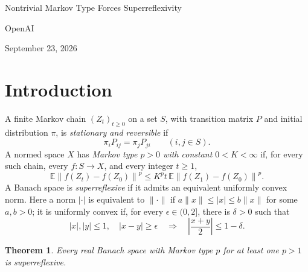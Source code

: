 \documentclass[11pt]{article}
\author{OpenAI}
\newtheorem{theorem}{Theorem}[section]
\theoremstyle{definition}
\theoremstyle{remark}
\newcommand{\E}{\mathbb E}
\newcommand{\norm}[1]{\left\lVert #1\right\rVert}
\newcommand{\papertitle}{Nontrivial Markov Type Forces Superreflexivity}
\begin{document}
\begin{center}
 {\Large\papertitle\par}
 \vspace{0.5\baselineskip}
 {OpenAI\par}
 {September 23, 2026\par}
\end{center}
\vspace{0.5\baselineskip}

\begin{abstract}
We prove that every real Banach space with Markov type $p>1$ is
superreflexive. Together with the known converse, this characterizes
superreflexivity by nontrivial Markov type. This answers Naor's question:
every real Banach space with nontrivial Markov type admits an equivalent
uniformly smooth norm.
\end{abstract}

\section{Introduction}

A finite Markov chain $(Z_t)_{t\geq0}$ on a set $S$, with transition
matrix $P$ and initial distribution $\pi$, is \emph{stationary and reversible}
if
\[
 \pi_iP_{ij}=\pi_jP_{ji}\qquad(i,j\in S).
\]
A normed space $X$ has \emph{Markov type $p>0$ with constant $0<K<\infty$} if, for
every such chain, every $f:S\to X$, and every integer $t\geq1$,
\begin{equation}\label{eq:markov-type}
 \E\norm{f(Z_t)-f(Z_0)}^p
 \leq K^p t\,\E\norm{f(Z_1)-f(Z_0)}^p.
\end{equation}
A Banach space is \emph{superreflexive} if it admits an equivalent
uniformly convex norm. Here a norm $|\cdot|$ is equivalent to $\|\cdot\|$
if $a\|x\|\leq|x|\leq b\|x\|$ for some $a,b>0$; it is uniformly convex
if, for every $\epsilon\in(0,2]$, there is $\delta>0$ such that
\[
 |x|,|y|\leq1,\quad |x-y|\geq\epsilon
 \quad\Longrightarrow\quad
 \left|\frac{x+y}{2}\right|\leq1-\delta.
\]

\begin{theorem}\label{thm:main}
Every real Banach space with Markov type $p$ for at least one $p>1$
is superreflexive.
\end{theorem}
\end{document}
